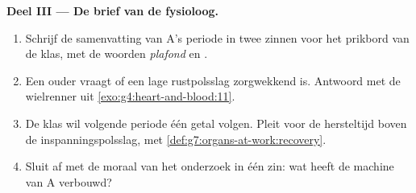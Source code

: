 \begin{problem}
\medskip\noindent\textbf{Deel III --- De brief van de
fysioloog.}
\begin{enumerate}[resume]
  \item Schrijf de samenvatting van A's periode in twee zinnen voor het
        prikbord van de klas, met de woorden \emph{plafond} en
        \emph{}.
  \item Een ouder vraagt of een lage rustpolsslag zorgwekkend is.
        Antwoord met de wielrenner uit
        \cref{exo:g4:heart-and-blood:11}.
  \item De klas wil volgende periode één getal volgen. Pleit voor de
        hersteltijd boven de inspanningspolsslag, met
        \cref{def:g7:organs-at-work:recovery}.
  \item Sluit af met de moraal van het onderzoek in één zin: wat heeft de
        machine van A verbouwd?
\end{enumerate}
\end{problem}
